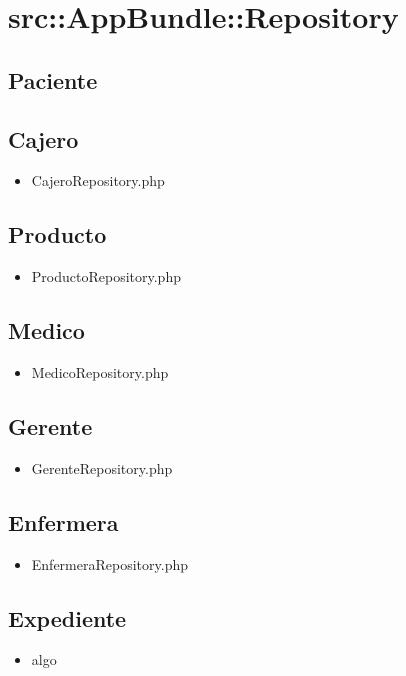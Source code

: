 \section{src::AppBundle::Repository}
	
	\subsection{Paciente}
		\subsection{Cajero}
		\begin{itemize}
			\item CajeroRepository.php
		\end{itemize}
		\subsection{Producto}
		\begin{itemize}
			\item ProductoRepository.php
		\end{itemize}
		\subsection{Medico}
		\begin{itemize}
			\item MedicoRepository.php
		\end{itemize}
		\subsection{Gerente}
		\begin{itemize}
			\item GerenteRepository.php
		\end{itemize}
		\subsection{Enfermera}
		\begin{itemize}
			\item EnfermeraRepository.php
		\end{itemize}
		\subsection{Expediente}
		\begin{itemize}
			\item algo
		\end{itemize}
